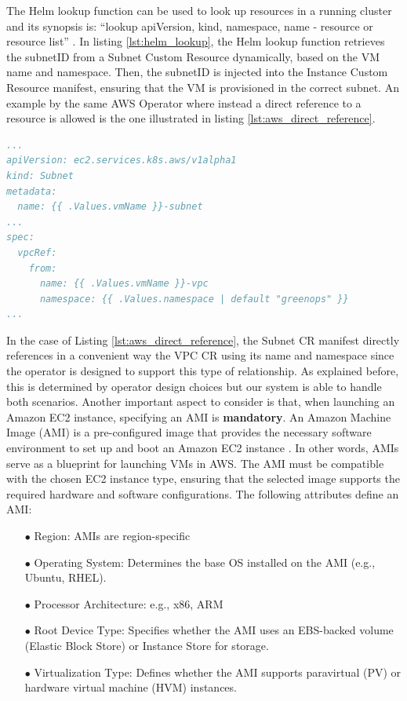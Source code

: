 The Helm lookup function can be used to look up resources in a running cluster and its synopsis is: ``lookup apiVersion, kind, namespace, name -\> resource or resource list'' \cite{helm_lookup}.
In listing \ref{lst:helm_lookup}, the Helm lookup function retrieves the subnetID from a Subnet Custom Resource dynamically, based on the VM name and namespace. Then, the subnetID is injected into the Instance Custom Resource manifest, ensuring that the VM is provisioned in the correct subnet.
An example by the same AWS Operator where instead a direct reference to a resource is allowed is the one illustrated in listing \ref{lst:aws_direct_reference}. \\

\begin{lstlisting}[language=yaml, caption={AWS Operator direct reference example}, label={lst:aws_direct_reference}]
...
apiVersion: ec2.services.k8s.aws/v1alpha1
kind: Subnet
metadata:
  name: {{ .Values.vmName }}-subnet
...
spec:
  vpcRef: 
    from: 
      name: {{ .Values.vmName }}-vpc
      namespace: {{ .Values.namespace | default "greenops" }}
...
\end{lstlisting}

In the case of Listing \ref{lst:aws_direct_reference}, the Subnet CR manifest directly references in a convenient way the VPC CR using its name and namespace since the operator is designed to support this type of relationship. 
As explained before, this is determined by operator design choices but our system is able to handle both scenarios.
\newline
Another important aspect to consider is that, when launching an Amazon EC2 instance, specifying an AMI is \textbf{mandatory}. 
An Amazon Machine Image (AMI) is a pre-configured image that provides the necessary software environment to set up and boot an Amazon EC2 instance \cite{aws_AMIs}. 
In other words, AMIs serve as a blueprint for launching VMs in AWS.
The AMI must be compatible with the chosen EC2 instance type, ensuring that the selected image supports the required hardware and software configurations.
The following attributes define an AMI:
\begin{itemize}[itemsep=0.2pt, topsep=1pt] 
  \item[$\bullet$] Region: AMIs are region-specific
  \item[$\bullet$] Operating System: Determines the base OS installed on the AMI (e.g., Ubuntu, RHEL).
  \item[$\bullet$] Processor Architecture: e.g., x86, ARM
  \item[$\bullet$] Root Device Type: Specifies whether the AMI uses an EBS-backed volume (Elastic Block Store) or Instance Store for storage.
  \item[$\bullet$] Virtualization Type: Defines whether the AMI supports paravirtual (PV) or hardware virtual machine (HVM) instances.
\end{itemize}

